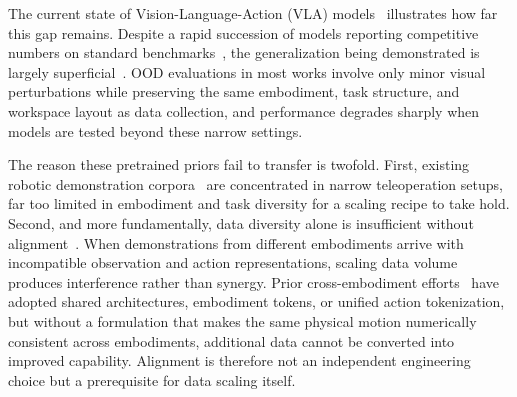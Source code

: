 The current state of Vision-Language-Action (VLA) models~\citep{openvla,bjorck2025grootn1,black2024pi0,pi05,community2026starvla,ddpvla,kim2025fine} illustrates how far this gap remains. 
Despite a rapid succession of models reporting competitive numbers on standard benchmarks~\citep{liu2023libero,nasiriany2024robocasa,mu2025robotwin}, the generalization being demonstrated is largely superficial~\citep{zhang2026world}. 
OOD evaluations in most works involve only minor visual perturbations while preserving the same embodiment, task structure, and workspace layout as data collection, and performance degrades sharply when models are tested beyond these narrow settings.


The reason these pretrained priors fail to transfer is twofold. 
First, existing robotic demonstration corpora~\citep{padalkar2023openxembodiment,khazatsky2024droid,fang2023rh20t} are concentrated in narrow teleoperation setups, far too limited in embodiment and task diversity for a scaling recipe to take hold. Second, and more fundamentally, data diversity alone is insufficient without alignment~\citep{luo2026joint, wang2026rethinking}.
When demonstrations from different embodiments arrive with incompatible observation and action representations, scaling data volume produces interference rather than synergy. Prior cross-embodiment efforts~\citep{bjorck2025grootn1,zheng2025xvla,pi05} have adopted shared architectures, embodiment tokens, or unified action tokenization, but without a formulation that makes the same physical motion numerically consistent across embodiments, additional data cannot be converted into improved capability.
Alignment is therefore not an independent engineering choice but a prerequisite for data scaling itself.


